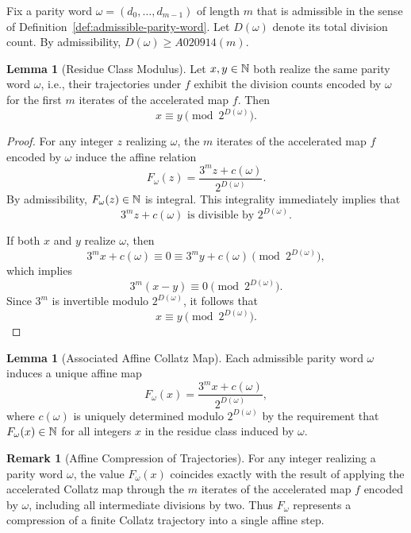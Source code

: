 \documentclass[12pt, oneside]{article}   	%
\numberwithin{equation}{section}          %
\theoremstyle{definition}
\newtheorem{lemma}[theorem]{Lemma}
\newtheorem*{remark}{Remark}
\begin{document}
Fix a parity word $\omega = (d_0,\dots,d_{m-1})$ of length $m$ that is admissible
in the sense of Definition~\ref{def:admissible-parity-word}. Let $D(\omega)$
denote its total division count. By admissibility, $D(\omega) \ge A020914(m)$.

\begin{lemma}[Residue Class Modulus]
\label{lem:residue-modulus}
Let $x,y \in \mathbb{N}$ both realize the same parity word $\omega$, i.e.,
their trajectories under $f$ exhibit the division counts encoded by $\omega$
for the first $m$ iterates of the accelerated map $f$. Then
\[
x \equiv y \pmod{2^{D(\omega)}}.
\]
\end{lemma}

\begin{proof}
For any integer $z$ realizing $\omega$, the $m$ iterates of the accelerated map
$f$ encoded by $\omega$ induce the affine relation
\[
F_\omega(z) = \frac{3^m z + c(\omega)}{2^{D(\omega)}}.
\]
By admissibility, $F_\omega(z)\in\mathbb{N}$ is integral. This integrality
immediately implies that
\[
3^m z + c(\omega) \text{ is divisible by } 2^{D(\omega)}.
\]

If both $x$ and $y$ realize $\omega$, then
\[
3^m x + c(\omega) \equiv 0 \equiv 3^m y + c(\omega) \pmod{2^{D(\omega)}},
\]
which implies
\[
3^m(x-y) \equiv 0 \pmod{2^{D(\omega)}}.
\]
Since $3^m$ is invertible modulo $2^{D(\omega)}$, it follows that
\[
x \equiv y \pmod{2^{D(\omega)}}.
\]
\end{proof}

\begin{lemma}[Associated Affine Collatz Map]
\label{lem:associated-map}
Each admissible parity word $\omega$ induces a unique affine map
\[
F_\omega(x) = \frac{3^m x + c(\omega)}{2^{D(\omega)}},
\]
where $c(\omega)$ is uniquely determined modulo $2^{D(\omega)}$ by the
requirement that $F_\omega(x)\in\mathbb{N}$ for all integers $x$ in the residue class
induced by $\omega$.
\end{lemma}

\begin{remark}[Affine Compression of Trajectories]
For any integer realizing a parity word $\omega$, the value $F_\omega(x)$
coincides exactly with the result of applying the accelerated Collatz map
through the $m$ iterates of the accelerated map $f$ encoded by $\omega$,
including all intermediate divisions by two. Thus $F_\omega$ represents a
compression of a finite Collatz trajectory into a single affine step.
\end{remark}
\end{document}
